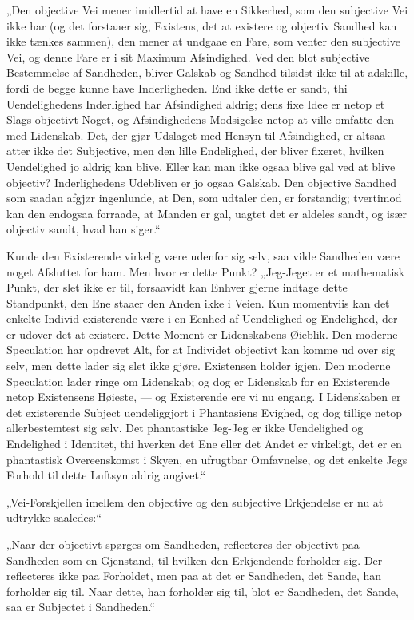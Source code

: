 „Den objective Vei mener imidlertid at have en Sikkerhed, som den
subjective Vei ikke har (og det forstaaer sig, Existens, det at
existere og objectiv Sandhed kan ikke tænkes sammen), den mener at
undgaae en Fare, som venter den subjective Vei, og denne Fare er i
sit Maximum Afsindighed. Ved den blot subjective Bestemmelse af
Sandheden, bliver Galskab og Sandhed tilsidst ikke til at
adskille, fordi
{} de begge kunne have Inderligheden. End ikke dette er sandt, thi
Uendelighedens
 Inderlighed har Afsindighed aldrig; dens fixe Idee er netop et
Slags objectivt Noget, og Afsindighedens Modsigelse netop at ville
omfatte den med Lidenskab. Det, der gjør Udslaget med Hensyn til
Afsindighed, er altsaa atter ikke det Subjective, men den lille
Endelighed, der bliver fixeret, hvilken Uendelighed jo aldrig kan
blive. Eller kan man ikke ogsaa blive gal ved at blive objectiv?
Inderlighedens Udebliven er jo ogsaa Galskab. Den objective
Sandhed som saadan afgjør ingenlunde, at Den, som udtaler den, er
forstandig; tvertimod kan den endogsaa forraade, at Manden er gal,
uagtet det er aldeles sandt, og især objectiv sandt, hvad han
siger.“

Kunde den Existerende virkelig være udenfor sig selv, saa vilde
Sandheden være noget Afsluttet for ham. Men hvor er dette Punkt?
„Jeg-Jeget er et mathematisk Punkt, der slet ikke er til,
forsaavidt kan Enhver gjerne indtage dette Standpunkt, den Ene
staaer den Anden ikke i Veien. Kun momentviis kan det enkelte
Individ existerende være i en Eenhed af Uendelighed og Endelighed,
der er udover det at existere. Dette Moment er Lidenskabens
Øieblik. Den moderne Speculation har opdrevet Alt, for at
Individet objectivt kan komme ud over sig selv, men dette lader
sig slet ikke gjøre. Existensen holder igjen. Den moderne
Speculation lader ringe om Lidenskab; og dog er Lidenskab for en
Existerende netop Existensens Høieste, --- og Existerende ere vi
nu engang. I Lidenskaben er det existerende Subject uendeliggjort
i Phantasiens Evighed, og
 dog tillige netop allerbestemtest sig selv. Det phantastiske
Jeg-Jeg er ikke Uendelighed og Endelighed i Identitet, thi hverken
det Ene eller det Andet er virkeligt, det er en phantastisk
Overeenskomst i Skyen, en ufrugtbar Omfavnelse, og det enkelte
Jegs Forhold til dette Luftsyn aldrig angivet.“

„Vei-Forskjellen imellem den objective og den subjective
Erkjendelse er nu at udtrykke saaledes:“

„Naar der objectivt spørges om Sandheden, reflecteres der
objectivt paa Sandheden som en Gjenstand, til hvilken den
Erkjendende forholder sig. Der reflecteres ikke paa Forholdet, men
paa at det er Sandheden, det Sande, han forholder sig til. Naar
dette, han forholder sig til, blot er Sandheden, det Sande, saa er
Subjectet i Sandheden.“

